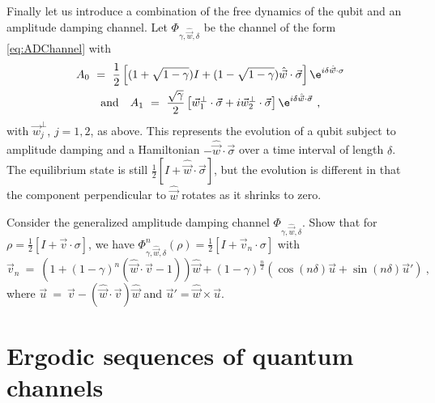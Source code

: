 \documentclass[12pt]{amsart}
\numberwithin{equation}{section}
\numberwithin{figure}{section}
\theoremstyle{theorem}
\begin{document}
Finally let us introduce a combination of the free dynamics of the qubit and an 
amplitude damping channel.  Let $\Phi_{\gamma,\hat{\vec{w}},\delta}$ be the 
channel of the form \eqref{eq:ADChannel} with
\begin{multline*}
	A_0 \ = \ \frac{1}{2}\left[(1+\sqrt{1-\gamma})I + 
(1-\sqrt{1-\gamma})\hat{\vec{w}}\cdot \vec{\sigma}\right] \e^{i\delta 
\hat{\vec{w}}\cdot \sigma} \\ \text{and} \quad  A_1 \ = \ 
\frac{\sqrt{\gamma}}{2} \left[ \vec{w}^\perp_1\cdot 
\vec{\sigma} + i \vec{w}^\perp_2\cdot \vec{\sigma}  \right] \e^{i \delta 
\hat{\vec{w}}\cdot \vec{\sigma} } \ ,
\end{multline*}
with $\vec{w}_j^\perp$, $j=1,2$, as above.
This represents the evolution of a qubit subject to amplitude damping and a 
Hamiltonian $- \hat{\vec{w}}\cdot \vec{\sigma}$ over a time interval of length 
$\delta$. The equilibrium state is still $\frac{1}{2}[I + \hat{\vec{w}}\cdot 
\vec{\sigma}]$, but the evolution is different in that the component 
perpendicular to $\hat{\vec{w}}$ rotates as it shrinks to zero. 
\begin{exer}Consider the generalized amplitude damping channel 
$\Phi_{\gamma,\hat{\vec{w}},\delta}$.  Show that for 
$\rho=\frac{1}{2}[I + \vec{v}\cdot \sigma]$, we have
$\Phi_{\gamma,\hat{\vec{w}},\delta}^n(\rho) = \frac{1}{2} [I + \vec{v}_n\cdot 
\sigma]$ with
$$ \vec{v}_n \ = \ (1 +(1-\gamma)^n(\hat{\vec{w}}\cdot \vec{v} - 
1))\hat{\vec{w}} +  (1-\gamma)^{\frac{n}{2}} (\cos(n\delta) \vec{u} + 
\sin(n\delta) \vec{u}') \ , $$
where $\vec{u} \ = \ \vec{v} - (\hat{\vec{w}}\cdot \vec{v})\hat{\vec{w}}$ and 
$\vec{u}'= \hat{\vec{w}}\times \vec{u}$. 
\end{exer}

\section{Ergodic sequences of quantum channels}
\end{document}
